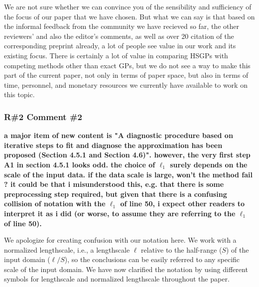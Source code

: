 \documentclass[11pt]{report}
\begin{document}
We are not sure whether we can convince you of the sensibility and sufficiency of the focus of our paper that we have chosen. But what we can say is that based on the informal feedback from the community we have recieved so far, the other reviewers' and also the editor's comments, as well as over 20 citation of the corresponding preprint already, a lot of people see value in our work and its existing focus. There is certainly a lot of value in comparing HSGPs with competing methods other than exact GPs, but we do not see a way to make this part of the current paper, not only in terms of paper space, but also in terms of time, personnel, and monetary resources we currently have available to work on this topic.





\subsubsection*{R\#2 Comment \#2}

\textbf{a major item of new content is "A diagnostic procedure based on iterative steps to fit and diagnose the approximation has been proposed (Section 4.5.1 and Section 4.6)". however, the very first step A1 in section 4.5.1 looks odd. the choice of $\ell_1$ surely depends on the scale of the input data. if the data scale is large, won't the method fail ? it could be that i misunderstood this, e.g. that there is some preprocessing step required, but given that there is a confusing collision of notation with the $\ell_1$ of line 50, i expect other readers to interpret it as i did (or worse, to assume they are referring to the $\ell_1$ of line 50).}

We apologize for creating confusion with our notation here. We work with a normalized lengthscale, i.e., a lengthscale $\ell$ relative to the half-range ($S$) of the input domain ($\ell/S$), so the conclusions can be easily referred to any specific scale of the input domain. We have now clarified the notation by using different symbols for lengthscale and normalized lengthscale throughout the paper. 
\end{document}
